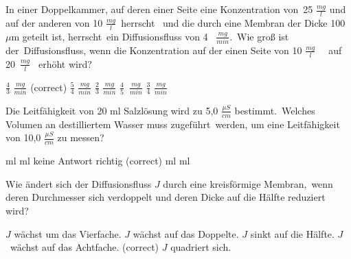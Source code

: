 \documentclass[11pt]{exam}
\begin{document}
\setlength{\voffset}{-0.5in}
\setlength{\headsep}{5pt}

\hspace{2mm}
 \hspace{5mm}
\vspace{4mm}

\begin{questions}

\question In einer Doppelkammer, auf deren einer Seite eine Konzentration von 25 \(\frac{mg}{l} \) und auf der anderen von 10 \(  \frac{mg}{l} \) herrscht  und die durch eine Membran der Dicke 100 \(\mu \)m geteilt ist, herrscht ein Diffusionsfluss von 4  \( \frac{mg}{min}\). Wie groß ist der Diffusionsfluss, wenn die Konzentration auf der einen Seite von 10 \(  \frac{mg}{l} \)   auf 20 \(  \frac{mg}{l} \)  erhöht wird?

\begin{choices}
	\choice \( \frac{4}{3} \) \( \frac{mg}{min} \) (correct)
	\choice \( \frac{5}{4} \) \( \frac{mg}{min} \)
	\choice \( \frac{2}{3} \) \( \frac{mg}{min} \)
	\choice \( \frac{4}{5} \) \( \frac{mg}{min} \)
	\choice \( \frac{3}{4} \) \( \frac{mg}{min} \)
\end{choices}

\vspace{3mm}\question Die Leitfähigkeit von 20 ml Salzlösung wird zu 5,0 \( \frac{\mu S}{cm} \) bestimmt. Welches Volumen an destilliertem Wasser muss zugeführt werden, um eine Leitfähigkeit von 10,0 \( \frac{\mu S}{cm} \) zu messen?

\begin{choices}
	 ml
	 ml
	\choice keine Antwort richtig (correct)
	 ml
	 ml
\end{choices}

\vspace{3mm}\question Wie ändert sich der Diffusionsfluss \( J \) durch eine kreisförmige Membran, wenn deren Durchmesser sich verdoppelt und deren Dicke auf die Hälfte reduziert wird?

\begin{choices}
	\choice \( J \) wächst um das Vierfache.
	\choice \( J \) wächst auf das Doppelte.
	\choice \( J \) sinkt auf die Hälfte.
	\choice \( J \) wächst auf das Achtfache. (correct)
	\choice \( J \) quadriert sich.
\end{choices}


\end{questions}
\end{document}
